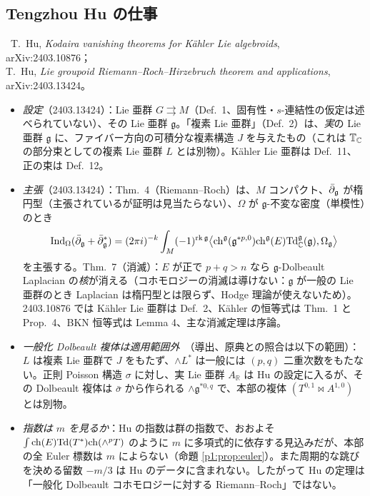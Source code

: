 \subsection{Tengzhou Hu の仕事}
\tC\ T.\ Hu, \emph{Kodaira vanishing theorems for K\"ahler Lie algebroids}, arXiv:2403.10876；\\ T.\ Hu, \emph{Lie groupoid Riemann--Roch--Hirzebruch theorem and applications}, arXiv:2403.13424。
\begin{itemize}
\item \emph{設定}（2403.13424）：Lie 亜群 $G\rightrightarrows M$（Def.\ 1、固有性・$s$-連結性の仮定は述べられていない）、その Lie 亜群 $\mathfrak g$。「複素 Lie 亜群」（Def.\ 2）は、\emph{実}の Lie 亜群 $\mathfrak g$ に、ファイバー方向の可積分な複素構造 $J$ を与えたもの（これは $\mathbb T_\mathbb C$ の部分束としての複素 Lie 亜群 $L$ とは別物）。Kähler Lie 亜群は Def.\ 11、正の束は Def.\ 12。
\item \emph{主張}（2403.13424）：Thm.\ 4（Riemann--Roch）は、$M$ コンパクト、$\bar\partial_{\mathfrak g}$ が楕円型（主張されているが証明は見当たらない）、$\Omega$ が $\mathfrak g$-不変な密度（単模性）のとき
\[\mathrm{Ind}_\Omega(\bar\partial_{\mathfrak g}+\bar\partial_{\mathfrak g}^*)=(2\pi i)^{-k}\int_M(-1)^{\mathrm{rk}\,\mathfrak g}\bigl\langle\mathrm{ch}^{\mathfrak g}(\mathfrak g^{*p,0})\mathrm{ch}^{\mathfrak g}(E)\mathrm{Td}^{\mathfrak g}_\mathbb C(\mathfrak g),\Omega_{\mathfrak g}\bigr\rangle\]
を主張する。Thm.\ 7（消滅）：$E$ が正で $p+q>n$ なら $\mathfrak g$-Dolbeault Laplacian の\emph{核}が消える（コホモロジーの消滅は導けない：$\mathfrak g$ が一般の Lie 亜群のとき Laplacian は楕円型とは限らず、Hodge 理論が使えないため）。2403.10876 では Kähler Lie 亜群は Def.\ 2、Kähler の恒等式は Thm.\ 1 と Prop.\ 4、BKN 恒等式は Lemma 4、主な消滅定理は序論。
\item \emph{一般化 Dolbeault 複体は適用範囲外}\tP\ （導出、原典との照合は以下の範囲）：$L$ は複素 Lie 亜群で $J$ をもたず、$\wedge L^*$ は一般には $(p,q)$ 二重次数をもたない。正則 Poisson 構造 $\sigma$ に対し、実 Lie 亜群 $A_{\mathbb R}$ は Hu の設定に入るが、その Dolbeault 複体は $\bar\sigma$ から作られる $\wedge\mathfrak g^{*0,q}$ で、本部の複体 $(T^{0,1}\bowtie A^{1,0})$ とは別物。
\item \emph{指数は $m$ を見るか}\tK：Hu の指数は群の指数で、おおよそ $\int\mathrm{ch}(E)\mathrm{Td}(T^*)\mathrm{ch}(\wedge^pT)$ のように $m$ に多項式的に依存する見込みだが、本部の全 Euler 標数は $m$ によらない（命題 \ref{p1:prop:euler}）。また周期的な跳びを決める留数 $-m/3$ は Hu のデータに含まれない。したがって Hu の定理は「一般化 Dolbeault コホモロジーに対する Riemann--Roch」ではない。

\end{itemize}
